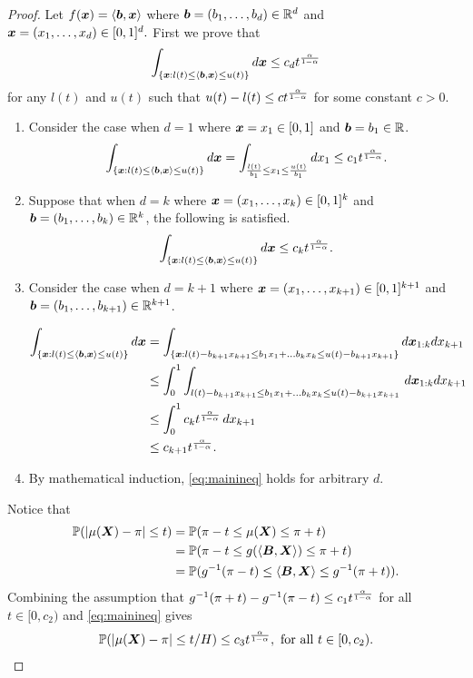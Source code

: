 \documentclass[11pt]{article}
\theoremstyle{plain}
\theoremstyle{definition}
\begin{document}
\begin{proof}
 Let $f(\bm x) = \langle \bm{b},\bm x\rangle$ where $\bm{b} = (b_1,\ldots, b_d)\in\mathbb{R}^{d}$ and $\bm x = (x_1,\ldots,x_d)\in[0,1]^d.$
First we prove that 
\begin{align}\label{eq:mainineq}
    \int_{\{\bm x: l(t)\leq \langle \bm{b},\bm x\rangle \leq u(t)\}}d\bm x \leq c_d t^{\alpha\over 1-\alpha}
\end{align} for any $l(t)$ and $u(t)$ such that $u(t)-l(t)  \leq c t^{\alpha\over 1-\alpha}$ for some constant $c>0.$

\begin{enumerate}
    \item Consider the case when $d = 1$ where $\bm x = x_1 \in [0,1]$ and $\bm{b} = b_1\in \mathbb{R}$.
    \begin{align}
        \int_{\{\bm x:l(t)\leq \langle \bm{b},\bm x\rangle \leq u(t)\}}d\bm x = \int_{\frac{l(t)}{b_1}\leq x_1 \leq\frac{u(t)}{b_1}}dx_1 \leq c_1t^{\alpha\over 1-\alpha}.
    \end{align}
    \item Suppose that when $d = k$ where $\bm x = (x_1,\ldots,x_k)\in[0,1]^k$ and $\bm{b} = (b_1,\ldots,b_k)\in\mathbb{R}^k$, the following is satisfied.
    \begin{align}
        \int_{\{\bm x:l(t)\leq \langle\bm{b},\bm x\rangle\leq u(t)\}} d\bm x \leq c_k t^{\alpha\over 1-\alpha}.
    \end{align} 
    \item Consider the case when $d = k+1$ where $\bm x = (x_1,\ldots,x_{k+1})\in[0,1]^{k+1}$ and $\bm{b} = (b_1,\ldots,b_{k+1})\in\mathbb{R}^{k+1}$.
   
    \begin{align}
        \int_{\{\bm x:l(t)\leq \langle \bm{b},\bm x\rangle \leq u(t)\}} d\bm x  &= \int_{\{\bm x:l(t)-b_{k+1}x_{k+1}\leq b_1x_1+\ldots b_kx_k\leq u(t)-b_{k+1}x_{k+1}\}} d\bm x_{1:k}dx_{k+1} \\&\leq \int_{0}^{1}\int_{l(t)-b_{k+1}x_{k+1}\leq b_1x_1+\ldots b_kx_k\leq u(t)-b_{k+1}x_{k+1}}\,d\bm x_{1:k}dx_{k+1}\\&\leq \int_{0}^1 c_kt^{\alpha\over 1-\alpha}\,dx_{k+1} \\&\leq c_{k+1}t^{\alpha\over 1-\alpha}.
    \end{align}
    \item By mathematical induction, \eqref{eq:mainineq} holds for arbitrary $d.$
 \end{enumerate}
 Notice that
 \begin{align}
     \mathbb{P}(|\mu(\bm X)-\pi|\leq t) &= \mathbb{P}(\pi-t \leq \mu(\bm X)\leq \pi+t)\\&= \mathbb{P}(\pi-t\leq g(\langle \bm B,\bm X\rangle )\leq \pi+t)\\&=\mathbb{P}(g^{-1}(\pi-t)\leq \langle\bm B,\bm X\rangle\leq g^{-1}(\pi+t)).
 \end{align}
Combining  the assumption that $g^{-1}(\pi+t)-g^{-1}(\pi-t) \leq c_1t^{\alpha\over 1-\alpha}$ for all $t\in[0,c_2)$ and \eqref{eq:mainineq} gives
 \begin{align}
     \mathbb{P}(|\mu(\bm X)-\pi|\leq t/H)\leq c_3 t^{\alpha\over 1-\alpha},  \text{ for all } t\in[0,c_2).
 \end{align}
 

\end{proof}
\end{document}
